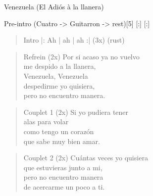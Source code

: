 \begin{song}[joropo]{Venezuela (El Adiós à la llanera)}
\begin{instrumental}{Pre-intro \textnormal{(Cuatro -> Guitarron -> rest)}}[5]
  [:]
  \measure{}  \measure{}    [:]
\end{instrumental}

\begin{verse}{Intro}
|:  \hspace{1em}Ah \hspace{2em} | ah \hspace{2em} | ah \hspace{2em} :| (3x) \hspace{1em}  \hspace{1em}(rust)
\end{verse}

\begin{verse}{Refrein (2x)}
\chord{}Por si acaso ya no vuelvo\\
\chord{}me despido a la llanera,\\
Venezuela, Venezuela\\
despedirme yo quisiera,\\
pero no encuentro manera. \hspace{1em} \\
\end{verse}

\begin{verse}{Couplet 1 (2x)}
Si yo pudiera tener\\
alas para volar\\
como tengo un corazón\\
que sabe muy bien amar.
\end{verse}

\begin{verse}{Couplet 2 (2x)}
Cu\'{a}ntas veces yo quisiera\\
que estuvieras junto a mi,\\
pero no encuentro manera\\
de acercarme un poco a ti.\hspace{2em}
\end{verse}


\end{song}
